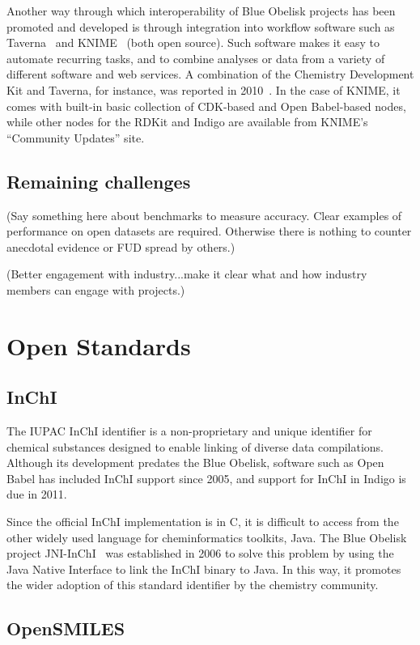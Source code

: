 \documentclass[10pt]{bmc_article}
\newenvironment{bmcformat}{\fussy\setboolean{publ}{true}}{\fussy}
\begin{document}
\begin{bmcformat}
Another way through which interoperability of Blue Obelisk projects
has been promoted and developed is through integration into
workflow software such as Taverna~\cite{Hull:2006p60} and
KNIME~\cite{WebKNIME} (both open source).
Such software makes it easy to automate recurring
tasks, and to combine analyses or data from a variety of different software
and web services.
A combination of the Chemistry Development Kit and Taverna, for instance, was
reported in 2010~\cite{Kuhn:2010p4001}. 
In the case of KNIME, it comes with built-in basic collection of CDK-based and
Open Babel-based nodes, while other nodes for the RDKit and Indigo are
available from KNIME's ``Community Updates'' site.

  \subsection*{Remaining challenges}

(Say something here about benchmarks to measure accuracy. Clear examples
 of performance on open datasets are required. Otherwise there is
 nothing to counter anecdotal evidence or FUD spread by others.)

(Better engagement with industry...make it clear what and how industry
 members can engage with projects.)

\section*{Open Standards}
  \subsection*{InChI}

The IUPAC InChI identifier is a non-proprietary and unique identifier
for chemical substances designed to enable linking of diverse data
compilations. Although its development predates the Blue Obelisk,
software such as Open Babel has included InChI support since 2005,
and support for InChI in Indigo is due in 2011.

Since the official InChI implementation is in C, it is difficult to
access from the other widely used language for cheminformatics
toolkits, Java. The Blue Obelisk project JNI-InChI~\cite{WebJNIInChI}
was established in 2006 to
solve this problem by using the Java Native Interface to link the
InChI binary to Java. In this way, it promotes the wider adoption of
this standard identifier by the chemistry community.

    \subsection*{OpenSMILES}


\end{bmcformat}
\end{document}
